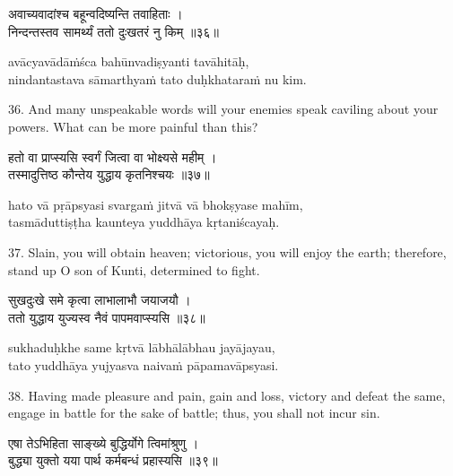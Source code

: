 \begin{gitaverse}
अवाच्यवादांश्च बहून्वदिष्यन्ति तवाहिताः । \\
निन्दन्तस्तव सामर्थ्यं ततो दुःखतरं नु किम् ॥३६॥
\end{gitaverse}

\begin{transliteration}
avācyavādāṁśca bahūnvadiṣyanti tavāhitāḥ, \\
nindantastava sāmarthyaṁ tato duḥkhataraṁ nu kim.
\end{transliteration}

36. And many unspeakable words will your enemies speak caviling about your
powers. What can be more painful than this?

\begin{gitaverse}
हतो वा प्राप्स्यसि स्वर्गं जित्वा वा भोक्ष्यसे महीम् । \\
तस्मादुत्तिष्ठ कौन्तेय युद्धाय कृतनिश्चयः ॥३७॥
\end{gitaverse}

\begin{transliteration}
hato vā pṛāpsyasi svargaṁ jitvā vā bhokṣyase mahīm, \\
tasmāduttiṣṭha kaunteya yuddhāya kṛtaniścayaḥ.
\end{transliteration}

37. Slain, you will obtain heaven; victorious, you will enjoy the earth;
therefore, stand up O son of Kunti, determined to fight.

\begin{gitaverse}
सुखदुःखे समे कृत्वा लाभालाभौ जयाजयौ । \\
ततो युद्धाय युज्यस्व नैवं पापमवाप्स्यसि ॥३८॥
\end{gitaverse}

\begin{transliteration}
sukhaduḥkhe same kṛtvā lābhālābhau jayājayau, \\
tato yuddhāya yujyasva naivaṁ pāpamavāpsyasi.
\end{transliteration}

38. Having made pleasure and pain, gain and loss, victory and defeat the same,
engage in battle for the sake of battle; thus, you shall not incur sin.

\begin{gitaverse}
एषा तेऽभिहिता साङ्ख्ये बुद्धिर्योगे त्विमांश्रुणु । \\
बुद्ध्या युक्तो यया पार्थ कर्मबन्धं प्रहास्यसि ॥३९॥
\end{gitaverse}

